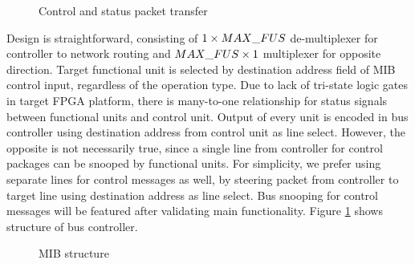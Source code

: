 	\begin{figure}[!h]
	\centering
	\hfill
	
	\caption{Control and status packet transfer}
	\end{figure}
	
		Design is straightforward, consisting of $1\times MAX\_FUS$ de-multiplexer for controller to network routing and $MAX\_FUS\times 1$ multiplexer for opposite direction. Target functional unit is selected by destination address field of MIB control input, regardless of the operation type.  Due to lack of tri-state logic gates in target FPGA platform, there is many-to-one relationship for status signals between functional units and control unit. Output of every unit is encoded in bus controller using destination address from control unit as line select. However, the opposite is not necessarily true, since a single line from controller for control packages can be snooped by functional units. For simplicity, we prefer using separate lines for control messages as well, by steering packet from controller to target line using destination address as line select. Bus snooping for control messages will be featured after validating main functionality. Figure \ref{fig:mib} shows structure of bus controller.
	\begin{figure}[!htbp]
		\centering
		\def\svgscale{0.50}
		
		\caption{MIB structure}
		\label{fig:mib} 
	\end{figure}